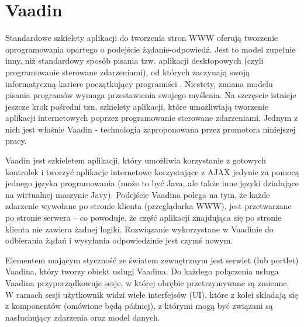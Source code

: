 \chapter{Vaadin}
Standardowe szkielety aplikacji do tworzenia stron WWW oferują tworzenie oprogramowania opartego o podejście żądanie-odpowiedź. Jest to model zupełnie inny, niż standardowy sposób pisania tzw. aplikacji desktopowych (czyli programowanie sterowane zdarzeniami), od których zaczynają swoją informatyczną kariere początkujący programiści . Niestety, zmiana modelu pisania programów wymaga przestawienia swojego myślenia. Na szczęscie istnieje jeszcze krok pośredni tzn. szkielety aplikacji, które umożliwiają tworzenie aplikacji internetowych poprzez programowanie sterowane zdarzeniami. Jednym z nich jest właśnie Vaadin - technologia zaproponowana przez promotora niniejszej pracy.

Vaadin jest szkieletem aplikacji, który umożliwia korzystanie z gotowych kontrolek i tworzyć aplikacje internetowe korzystające z AJAX jedynie za pomocą jednego języka programowania (może to być Java, ale także inne języki działające na wirtualnej maszynie Javy). Podejście Vaadina polega na tym, że każde zdarzenie wywołane po stronie klienta (przeglądarka WWW), jest przetwarzane po stronie serwera – co powoduje, że część aplikacji znajdująca się po stronie klienta nie zawiera żadnej logiki. Rozwiązanie wykorzystane w Vaadinie do odbierania żądań i wysyłania odpowiedzinie jest czymś nowym.

Elementem mającym styczność ze światem zewnętrznym jest serwlet (lub portlet) Vaadina, który tworzy obiekt usługi Vaadina. Do każdego połączenia usługa Vaadina przyporządkowuje sesje, w której obrębie przetrzymywane są zmienne. W ramach sesji użytkownik widzi wiele interfejsów (UI), które z kolei składają się z komponentów (omówione będą później), z którymi mogą być związani są nasłuchujący zdarzenia oraz model danych. 

